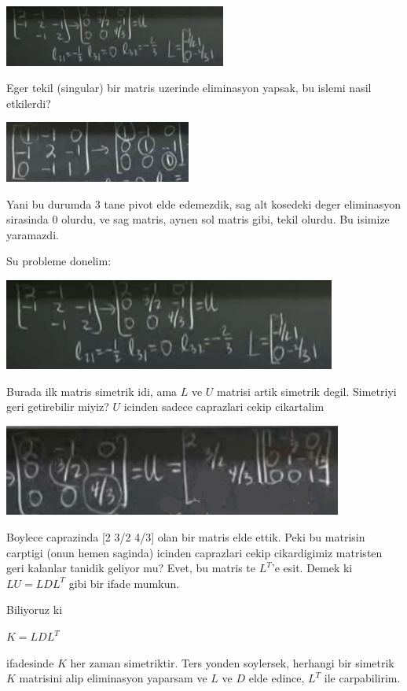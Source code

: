 \documentclass[12pt,fleqn]{article}
\begin{document}
\includegraphics[height=2cm]{3_4.png}

Eger tekil (singular) bir matris uzerinde eliminasyon yapsak, bu islemi
nasil etkilerdi? 

\includegraphics[height=2cm]{3_5.png}

Yani bu durumda 3 tane pivot elde edemezdik, sag alt kosedeki deger
eliminasyon sirasinda 0 olurdu, ve sag matris, aynen sol matris gibi, tekil
olurdu. Bu isimize yaramazdi. 

Su probleme donelim: 

\includegraphics[height=3cm]{3_4.png}

Burada ilk matris simetrik idi, ama $L$ ve $U$ matrisi artik simetrik
degil. Simetriyi geri getirebilir miyiz? $U$ icinden sadece caprazlari
cekip cikartalim

\includegraphics[height=3cm]{3_6.png}

Boylece caprazinda [2 3/2 4/3] olan bir matris elde ettik. Peki bu matrisin
carptigi (onun hemen saginda) icinden caprazlari cekip cikardigimiz
matristen geri kalanlar tanidik geliyor mu? Evet, bu matris te $L^T$'e
esit. Demek ki $LU = LDL^T$ gibi bir ifade mumkun.

Biliyoruz ki 

$K = LDL^T$

ifadesinde $K$ her zaman simetriktir. Ters yonden soylersek, herhangi bir
simetrik $K$ matrisini alip eliminasyon yaparsam ve $L$ ve $D$ elde edince,
$L^T$ ile carpabilirim. 
\end{document}
